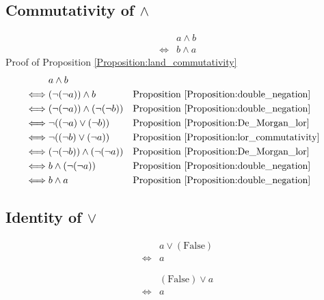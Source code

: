 \subsection{Commutativity of $\land$}
\begin{prop}
\label{Proposition:land_commutativity}
\begin{align*}
& a \land b \\
\iff & b \land a
\end{align*}
Proof of Proposition \ref{Proposition:land_commutativity}
\begin{align*}
& a \land b \\
\iff & (\lnot (\lnot a)) \land b
& & \text{Proposition \ref{Proposition:double_negation}} \\
\iff & (\lnot (\lnot a)) \land (\lnot (\lnot b))
& & \text{Proposition \ref{Proposition:double_negation}} \\
\iff & \lnot ((\lnot a) \lor (\lnot b))
& & \text{Proposition \ref{Proposition:De_Morgan_lor}} \\
\iff & \lnot ((\lnot b) \lor (\lnot a))
& & \text{Proposition \ref{Proposition:lor_commutativity}} \\
\iff & (\lnot (\lnot b)) \land (\lnot (\lnot a))
& & \text{Proposition \ref{Proposition:De_Morgan_lor}} \\
\iff & b \land (\lnot (\lnot a))
& & \text{Proposition \ref{Proposition:double_negation}} \\
\iff & b \land a
& & \text{Proposition \ref{Proposition:double_negation}} \\
\end{align*}
\end{prop}

\subsection{Identity of $\lor$}
\begin{prop}
\label{Proposition:lor_identity_1}
\begin{align*}
& a \lor (\text{False}) \\
\iff & a
\end{align*}
\end{prop}

\begin{prop}
\label{Proposition:lor_identity_2}
\begin{align*}
& (\text{False}) \lor a \\
\iff & a
\end{align*}
\end{prop}


